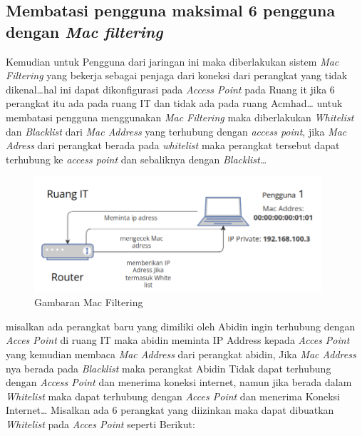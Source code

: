 \documentclass[a4paper, 12pt]{article}
\begin{document}
\subsection{Membatasi pengguna maksimal 6 pengguna dengan \textit{Mac filtering}}
Kemudian untuk Pengguna dari jaringan ini maka diberlakukan sistem \textit{Mac Filtering} yang bekerja sebagai penjaga dari koneksi dari perangkat yang tidak dikenal\dots hal ini dapat dikonfigurasi pada \textit{Access Point} pada Ruang it jika 6 perangkat itu ada pada ruang IT dan tidak ada pada ruang Acmhad\dots \newline
untuk membatasi pengguna menggunakan \textit{Mac Filtering} maka diberlakukan \textit{Whitelist} dan \textit{Blacklist} dari \textit{Mac Address} yang terhubung dengan \textit{access point}, jika \textit{Mac Adress} dari perangkat berada pada \textit{whitelist} maka perangkat tersebut dapat terhubung ke \textit{access point} dan sebaliknya dengan \textit{Blacklist}\dots
\begin{figure}[H]
  \begin{center}
    \includegraphics[width=0.95\textwidth]{images/gambar2.png}
  \end{center}
  \caption{Gambaran Mac Filtering}\label{fig:macfiltering}
\end{figure}
misalkan ada perangkat baru yang dimiliki oleh Abidin ingin terhubung dengan \textit{Acces Point} di ruang IT maka abidin meminta IP Address kepada \textit{Acces Point} yang kemudian membaca \textit{Mac Address} dari perangkat abidin, Jika \textit{Mac Address} nya berada pada \textit{Blacklist} maka perangkat Abidin Tidak dapat terhubung dengan \textit{Access Point} dan menerima koneksi internet, namun jika berada dalam \textit{Whitelist} maka dapat terhubung dengan \textit{Acces Point} dan menerima Koneksi Internet\dots
Misalkan ada 6 perangkat yang diizinkan maka dapat dibuatkan \textit{Whitelist} pada \textit{Acces Point} seperti Berikut:
\end{document}
